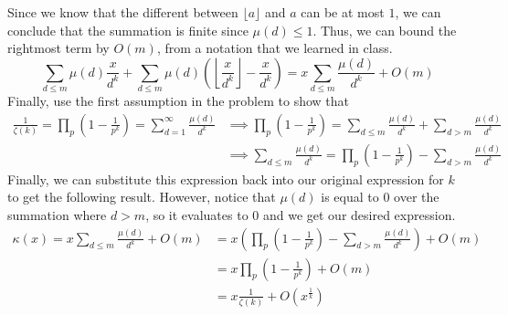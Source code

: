 Since we know that the different between $\lfloor a\rfloor$ and $a$ can be at most $1$, we can conclude that the summation is finite since $\mu(d) \leq 1$. Thus, we can bound the rightmost term by $O(m)$, from a notation that we learned in class.
$$
\sum_{d \leq m} \mu(d)\frac{x}{d^k} + \sum_{d \leq m} \mu(d)\left(\left\lfloor \frac{x}{d^k} \right\rfloor - \frac{x}{d^k}\right) = x\sum_{d \leq m} \frac{\mu(d)}{d^k} + O(m)
$$
Finally, use the first assumption in the problem to show that
\begin{align*}
    \frac{1}{\zeta(k)} = \prod_p \left(1-\frac{1}{p^k}\right) = \sum_{d=1}^\infty \frac{\mu(d)}{d^k} &\implies \prod_p \left(1-\frac{1}{p^k}\right) = \sum_{d \leq m} \frac{\mu(d)}{d^k} + \sum_{d > m} \frac{\mu(d)}{d^k}\\
    &\implies  \sum_{d \leq m} \frac{\mu(d)}{d^k} = \prod_p \left(1-\frac{1}{p^k}\right) - \sum_{d > m} \frac{\mu(d)}{d^k} 
\end{align*}
Finally, we can substitute this expression back into our original expression for $k$ to get the following result. However, notice that $\mu(d)$ is equal to $0$ over the summation where $d > m$, so it evaluates to $0$ and we get our desired expression.
\begin{align*}
    \kappa(x) = x\sum_{d \leq m} \frac{\mu(d)}{d^k} + O(m) &= x\left(\prod_p \left(1-\frac{1}{p^k}\right) - \sum_{d > m} \frac{\mu(d)}{d^k} \right) + O(m)\\
    &= x \prod_p \left(1-\frac{1}{p^k}\right) + O(m)\\
    &= x\frac{1}{\zeta(k)} + O\left(x^{\frac{1}{k}}\right)
\end{align*}